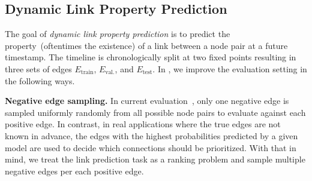 \subsection{Dynamic Link Property Prediction}


The goal of \emph{dynamic link property prediction} is to predict the property~(oftentimes the existence) of a link between a node pair at a future timestamp. 
The timeline is chronologically split at two fixed points resulting in three sets of edges $E_\text{train}$, $E_\text{val.}$, and $E_\text{test}$. In \name, we improve the evaluation setting in the following ways. 

\textbf{Negative edge sampling.} In current evaluation~\cite{kumar2019predicting,xu2020inductive,rossi2020temporal,wang2021tcl,souza2022provably,you2022roland,chanpuriya2022direct,zhou2022tgl}, only one negative edge is sampled uniformly randomly from all possible node pairs to evaluate against each positive edge. 
In contrast, in real applications where the true edges are not known in advance, the edges with the highest probabilities predicted by a given model are used to decide which connections should be prioritized. 
With that in mind, we treat the link prediction task as a ranking problem and sample multiple negative edges per each positive edge. %

